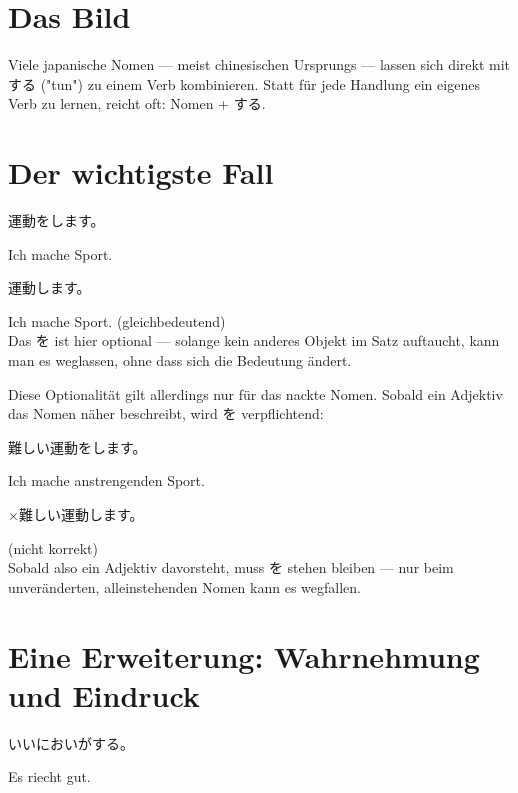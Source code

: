 \documentclass[12pt]{book}
\begin{document}
\section*{Das Bild}

Viele japanische Nomen — meist chinesischen Ursprungs — lassen sich direkt mit する ("tun") zu einem Verb kombinieren. Statt für jede Handlung ein eigenes Verb zu lernen, reicht oft: Nomen + する.

\section*{Der wichtigste Fall}

\par\quad 運動をします。\\
\par\quad Ich mache Sport.\\

\par\quad 運動します。\\
\par\quad Ich mache Sport. (gleichbedeutend)\\

Das を ist hier optional — solange kein anderes Objekt im Satz auftaucht, kann man es weglassen, ohne dass sich die Bedeutung ändert.

Diese Optionalität gilt allerdings nur für das nackte Nomen. Sobald ein Adjektiv das Nomen näher beschreibt, wird を verpflichtend:

\par\quad 難しい運動をします。\\
\par\quad Ich mache anstrengenden Sport.\\

\par\quad ×難しい運動します。\\
\par\quad (nicht korrekt)\\

Sobald also ein Adjektiv davorsteht, muss を stehen bleiben — nur beim unveränderten, alleinstehenden Nomen kann es wegfallen.

\section*{Eine Erweiterung: Wahrnehmung und Eindruck}

\par\quad いいにおいがする。\\
\par\quad Es riecht gut.\\
\end{document}
